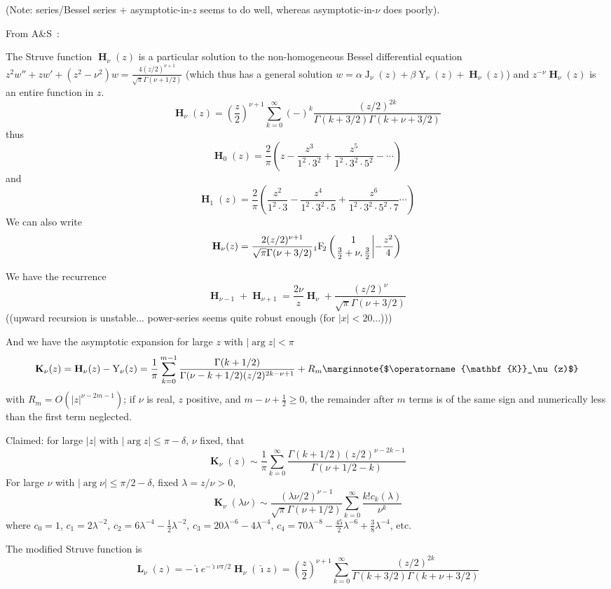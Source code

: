 \documentclass[10pt,dvipdfmx,letterpaper,twoside]{article}
\let\O=\operatorname
\newcommand{\Ob}[1]{\operatorname{\mathbf{#1}}}
\newcommand{\ii}{{\hat{\imath}}}
\newcommand{\Hyper}[5]{{\mathop{{}_{#1}\!\O{F\!}_{#2}\left({\genfrac{}{}{0pt}{}{#3}{#4}}\middle|{#5}\right)}}}
\let\DEF=\marginnote
\let\al=\alpha
\let\Gam=\Gamma
\let\lam=\lambda
\begin{document}
(Note: series/Bessel series + asymptotic-in-$z$ seems to do well, whereas asymptotic-in-$\nu$ does poorly).

From A\&S~\cite{a&s}:

The Struve function $\Ob{H}_\nu(z)$ is a particular solution to the non-homogeneous Bessel differential equation
$z^2w'' + zw' + (z^2-\nu^2)w = \frac{4(z/2)^{\nu+1}}{\sqrt{\pi}\Gam(\nu+1/2)}$
(which thus has a general solution $w=\al\O{J}_\nu(z) + \beta\O{Y}_\nu(z) + \Ob{H}_\nu(z)$)
and $z^{-\nu}\Ob{H}_\nu(z)$ is an entire function in $z$.
\[ \Ob{H}_\nu(z) = \left(\frac{z}{2}\right)^{\nu+1}\sum_{k=0}^\infty(-)^k\frac{(z/2)^{2k}}{\Gam(k+3/2)\Gam(k+\nu+3/2)} \]
thus
\[ \Ob{H}_0(z) = \frac2\pi\left(z-\frac{z^3}{1^2\cdot3^2}+\frac{z^5}{1^2\cdot3^2\cdot5^2}-\cdots\right) \]
and
\[ \Ob{H}_1(z) = \frac2\pi\left(\frac{z^2}{1^2\cdot3}-\frac{z^4}{1^2\cdot3^2\cdot5}+\frac{z^6}{1^2\cdot3^2\cdot5^2\cdot7}\cdots\right) \]
We can also write
\[ \Ob{H}_\nu(z) = \frac{2(z/2)^{\nu+1}}{\sqrt{\pi} \Gam(\nu+3/2)} \Hyper{1}{2}{1}{\tfrac32+\nu, \tfrac32}{-\frac{z^2}{4}} \]

We have the recurrence
\[ \Ob{H}_{\nu-1} + \Ob{H}_{\nu+1} = \frac{2\nu}{z}\Ob{H}_\nu + \frac{(z/2)^\nu}{\sqrt{\pi} \Gam(\nu+3/2)} \]
((upward recursion is unstable... power-series seems quite robust enough (for $|x|<20$...)))

And we have the asymptotic expansion for large $z$ with $|\arg z|<\pi$
\[ \Ob{K}_\nu(z) = \Ob{H}_\nu(z) - \O{Y}_\nu(z) = \frac{1}{\pi}\sum_{k=0}^{m-1}\frac{\Gam(k+1/2)}{\Gam(\nu-k+1/2)(z/2)^{2k-\nu+1}} + R_m \DEF{$\Ob{K}_\nu(z)$} \]
with $R_m=O(|z|^{\nu-2m-1})$; if $\nu$ is real, $z$ positive, and $m-\nu+\tfrac12\geq0$, the remainder after $m$ terms is of the
same sign and numerically less than the first term neglected.

Claimed: for large $|z|$ with $|\arg z|\leq\pi-\delta$, $\nu$ fixed, that
\[ \Ob{K}_\nu(z) \sim \frac{1}{\pi} \sum_{k=0}^\infty \frac{\Gam(k+1/2)(z/2)^{\nu-2k-1}}{\Gam(\nu+1/2-k)} \]
For large $\nu$ with $|\arg\nu|\leq\pi/2-\delta$, fixed $\lam=z/\nu>0$,
\[ \Ob{K}_\nu(\lam\nu) \sim \frac{(\lam\nu/2)^{\nu-1}}{\sqrt{\pi}\Gam(\nu+1/2)} \sum_{k=0}^\infty \frac{k! c_k(\lam)}{\nu^k} \]
where $c_0=1$, $c_1=2\lam^{-2}$, $c_2=6\lam^{-4}-\frac12\lam^{-2}$, $c_3=20\lam^{-6}-4\lam^{-4}$,
$c_4=70\lam^{-8}-\frac{45}{2}\lam^{-6}+\frac{3}{8}\lam^{-4}$, etc.

The modified Struve function is
\[ \Ob{L}_\nu(z) = -\ii e^{-\ii\nu\pi/2} \Ob{H}_\nu(\ii z)
    = \left(\frac{z}{2}\right)^{\nu+1}\sum_{k=0}^\infty\frac{(z/2)^{2k}}{\Gam(k+3/2)\Gam(k+\nu+3/2)} \]
\end{document}
